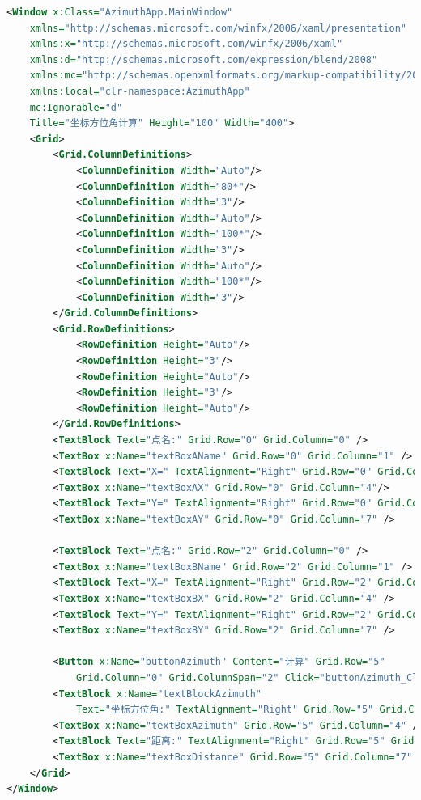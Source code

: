 \begin{lstlisting}[language=xml]
<Window x:Class="AzimuthApp.MainWindow"
    xmlns="http://schemas.microsoft.com/winfx/2006/xaml/presentation"
    xmlns:x="http://schemas.microsoft.com/winfx/2006/xaml"
    xmlns:d="http://schemas.microsoft.com/expression/blend/2008"
    xmlns:mc="http://schemas.openxmlformats.org/markup-compatibility/2006"
    xmlns:local="clr-namespace:AzimuthApp"
    mc:Ignorable="d"
    Title="坐标方位角计算" Height="100" Width="400">
    <Grid>
        <Grid.ColumnDefinitions>
            <ColumnDefinition Width="Auto"/>
            <ColumnDefinition Width="80*"/>
            <ColumnDefinition Width="3"/>
            <ColumnDefinition Width="Auto"/>
            <ColumnDefinition Width="100*"/>
            <ColumnDefinition Width="3"/>
            <ColumnDefinition Width="Auto"/>
            <ColumnDefinition Width="100*"/>
            <ColumnDefinition Width="3"/>
        </Grid.ColumnDefinitions>
        <Grid.RowDefinitions>
            <RowDefinition Height="Auto"/>
            <RowDefinition Height="3"/>
            <RowDefinition Height="Auto"/>
            <RowDefinition Height="3"/>
            <RowDefinition Height="Auto"/>
        </Grid.RowDefinitions>
        <TextBlock Text="点名:" Grid.Row="0" Grid.Column="0" />
        <TextBox x:Name="textBoxAName" Grid.Row="0" Grid.Column="1" />
        <TextBlock Text="X=" TextAlignment="Right" Grid.Row="0" Grid.Column="3"/>
        <TextBox x:Name="textBoxAX" Grid.Row="0" Grid.Column="4"/>
        <TextBlock Text="Y=" TextAlignment="Right" Grid.Row="0" Grid.Column="6"/>
        <TextBox x:Name="textBoxAY" Grid.Row="0" Grid.Column="7" />
        
        <TextBlock Text="点名:" Grid.Row="2" Grid.Column="0" />
        <TextBox x:Name="textBoxBName" Grid.Row="2" Grid.Column="1" />
        <TextBlock Text="X=" TextAlignment="Right" Grid.Row="2" Grid.Column="3"/>
        <TextBox x:Name="textBoxBX" Grid.Row="2" Grid.Column="4" />
        <TextBlock Text="Y=" TextAlignment="Right" Grid.Row="2" Grid.Column="6"/>
        <TextBox x:Name="textBoxBY" Grid.Row="2" Grid.Column="7" />
        
        <Button x:Name="buttonAzimuth" Content="计算" Grid.Row="5" 
            Grid.Column="0" Grid.ColumnSpan="2" Click="buttonAzimuth_Click"/>
        <TextBlock x:Name="textBlockAzimuth" 
            Text="坐标方位角:" TextAlignment="Right" Grid.Row="5" Grid.Column="3"/>
        <TextBox x:Name="textBoxAzimuth" Grid.Row="5" Grid.Column="4" />
        <TextBlock Text="距离:" TextAlignment="Right" Grid.Row="5" Grid.Column="6" />
        <TextBox x:Name="textBoxDistance" Grid.Row="5" Grid.Column="7" />
    </Grid>
</Window>
\end{lstlisting}

